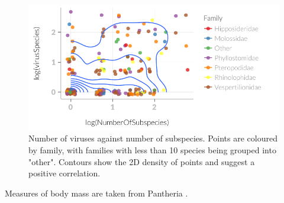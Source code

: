 \begin{knitrout}\footnotesize
{}\color{fgcolor}\begin{figure}[t]

{\centering \includegraphics[width=\textwidth]{figure/subsDataFrame-1} 

}

\caption[
Number of viruses against number of subspecies]{
Number of viruses against number of subspecies.
Points are coloured by family, with families with less than 10 species being grouped into "other".
Contours show the 2D density of points and suggest a positive correlation.
}\label{fig:subsDataFrame}
\end{figure}


\end{knitrout}

Measures of body mass are taken from Pantheria \cite{jones2009pantheria}.
























